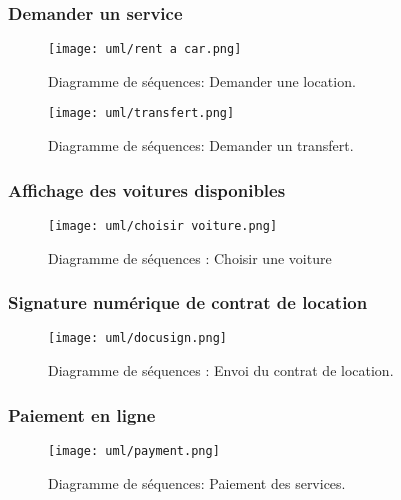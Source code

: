 \subsubsection{Demander un service}
\begin{figure}[H]
    \centering
    \texttt{[image: uml/rent a car.png]}
    \vspace{1cm}
    \captionsetup{justification=centering}

    \caption{Diagramme de séquences: Demander une location.}
    \label{fig:seq_location}
\end{figure}
\vspace{1cm}
\begin{figure}[H]
    \centering
    \texttt{[image: uml/transfert.png]}
    \vspace{1cm}
    \captionsetup{justification=centering}

    \caption{Diagramme de séquences: Demander un transfert.}
    \label{fig:seq_transfert}
\end{figure}
\subsubsection{Affichage des voitures disponibles}
\begin{figure}[H]
    \centering
    \texttt{[image: uml/choisir voiture.png]}
    \vspace{1cm}
    \captionsetup{justification=centering}

    \caption{Diagramme de séquences : Choisir une voiture}
    \label{fig:seq_car_select}
\end{figure}
\subsubsection{Signature numérique de contrat de location}
\begin{figure}[H]
    \centering
    \texttt{[image: uml/docusign.png]}
    \captionsetup{justification=centering}
    \caption{Diagramme de séquences : Envoi du contrat de location.}
    \label{fig:seq_location_contract}
\end{figure}
\subsubsection{Paiement en ligne}
\begin{figure}[H]
    \centering
    \texttt{[image: uml/payment.png]}
    \captionsetup{justification=centering}
    \caption{Diagramme de séquences: Paiement des services.}
    \label{fig:seq_payment}
\end{figure}
